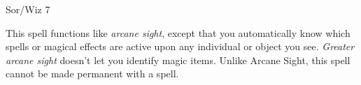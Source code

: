 
\begin{description*}
\item[Level:] Sor/Wiz 7
\end{description*}

This spell functions like \textit{arcane sight}, except that you automatically
know which spells or magical effects are active upon any individual or object you
see.
\textit{Greater arcane sight} doesn't let you identify magic items.
Unlike Arcane Sight, this spell cannot be made permanent with a  spell.